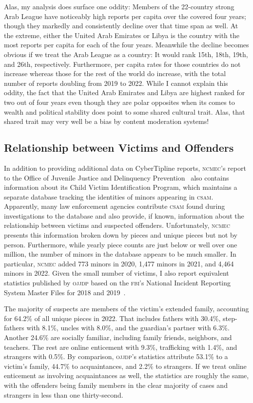 \documentclass[nonacm,screen]{acmart}
\newcommand\V[1]{\textsc{\MakeLowercase{#1}}}
\begin{document}
Alas, my analysis does surface one oddity: Members of the 22-country strong Arab
League have noticeably high reports per capita over the covered four years;
though they markedly and consistently decline over that time span as well. At
the extreme, either the United Arab Emirates or Libya is the country with the
most reports per capita for each of the four years. Meanwhile the decline
becomes obvious if we treat the Arab League as a country: It would rank 15th,
18th, 19th, and 26th, respectively. Furthermore, per capita rates for those
countries do not increase whereas those for the rest of the world do increase,
with the total number of reports doubling from 2019 to 2022. While I cannot
explain this oddity, the fact that the United Arab Emirates and Libya are
highest ranked for two out of four years even though they are polar opposites
when its comes to wealth and political stability does point to some shared
cultural trait. Alas, that shared trait may very well be a bias by content
moderation systems!


\subsection{Relationship between Victims and Offenders}

In addition to providing additional data on CyberTipline reports, \V{NCMEC}'s
report to the Office of Juvenile Justice and Delinquency
Prevention~\cite{NCMEC2023} also contains information about its Child Victim
Identification Program, which maintains a separate database tracking the
identities of minors appearing in \V{CSAM}. Apparently, many law enforcement
agencies contribute \V{CSAM} found during investigations to the database and
also provide, if known, information about the relationship between victims and
suspected offenders. Unfortunately, \V{NCMEC} presents this information broken
down by pieces and unique pieces but not by person. Furthermore, while yearly
piece counts are just below or well over one million, the number of minors in
the database appears to be much smaller. In particular, \V{NCMEC} added 773
minors in 2020, 1,477 minors in 2021, and 4,464 minors in 2022. Given the small
number of victims, I also report equivalent statistics published by \V{OJJDP}
based on the \V{FBI}'s National Incident Reporting System Master Files for 2018
and 2019~\cite{OJJDPStats2022}.

The majority of suspects are members of the victim's extended family, accounting
for 64.2\% of all unique pieces in 2022. That includes fathers with 30.4\%,
step-fathers with 8.1\%, uncles with 8.0\%, and the guardian's partner with
6.3\%. Another 24.6\% are socially familiar, including family friends,
neighbors, and teachers. The rest are online enticement with 9.3\%, trafficking
with 1.4\%, and strangers with 0.5\%. By comparison, \V{OJJDP}'s statistics
attribute 53.1\% to a victim's family, 44.7\% to acquaintances, and 2.2\% to
strangers. If we treat online enticement as involving acquaintances as well, the
statistics are roughly the same, with the offenders being family members in the
clear majority of cases and strangers in less than one thirty-second.
\end{document}

